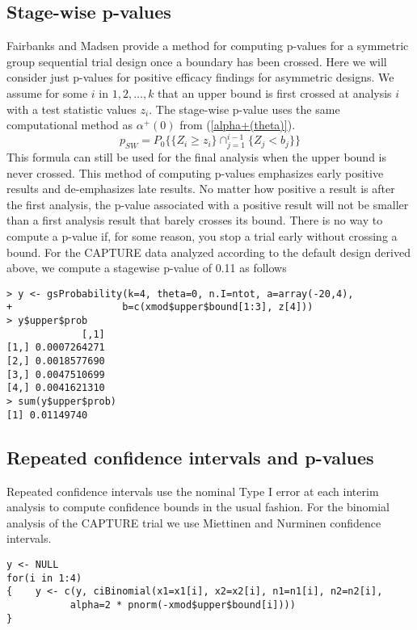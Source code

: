 \subsection{Stage-wise p-values}
Fairbanks and Madsen \cite{FairbanksMadsen} provide a method for computing p-values for a symmetric group sequential trial design once a boundary has been crossed.
Here we will consider just p-values for positive efficacy findings for asymmetric designs.
We assume for some $i$ in $1,2,\ldots,k$ that an upper bound is first crossed at analysis $i$ with a test statistic values $z_i$.
The stage-wise p-value uses the same computational method as $\alpha^+(0)$ from (\ref{alpha+(theta)}).
\begin{equation}
p_{SW}=P_{0}\{\{Z_{i}\geq z_{i}\}\cap_{j=1}^{i-1}%
\{Z_{j}<b_{j}\}\}\label{eq:pSW}%
\end{equation}
This formula can still be used for the final analysis when the upper bound is never crossed.
This method of computing p-values emphasizes early positive results and de-emphasizes late results.
No matter how positive a result is after the first analysis, the p-value associated with a positive result will not be smaller than a first analysis result that barely crosses its bound.
There is no way to compute a p-value if, for some reason, you stop a trial early without crossing a bound. 
For the CAPTURE data analyzed according to the default design derived above, we compute a stagewise p-value of 0.11 as follows

\begin{verbatim}
> y <- gsProbability(k=4, theta=0, n.I=ntot, a=array(-20,4), 
+                   b=c(xmod$upper$bound[1:3], z[4]))
> y$upper$prob
             [,1]
[1,] 0.0007264271
[2,] 0.0018577690
[3,] 0.0047510699
[4,] 0.0041621310
> sum(y$upper$prob)
[1] 0.01149740
\end{verbatim}

\subsection{Repeated confidence intervals and p-values}
Repeated confidence intervals use the nominal Type I error at each interim analysis to compute confidence bounds in the usual fashion.
For the binomial analysis of the CAPTURE trial we use Miettinen and Nurminen \cite{MandN} confidence intervals.
\begin{verbatim}
y <- NULL
for(i in 1:4) 
{    y <- c(y, ciBinomial(x1=x1[i], x2=x2[i], n1=n1[i], n2=n2[i], 
           alpha=2 * pnorm(-xmod$upper$bound[i])))
}
\end{verbatim}

